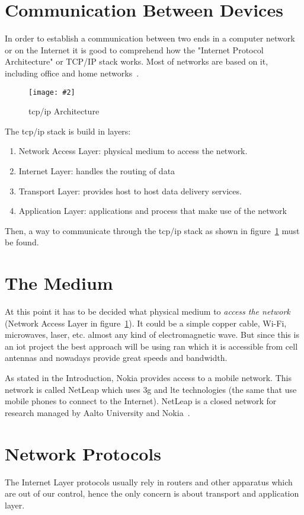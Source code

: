 \documentclass[hidelinks,11pt,a4paper,oneside,article]{memoir}
\newcommand{\putimage}[3][10] %
{
\begin{figure}[h]
	\centering
	\captionsetup{justification=centering}
	\texttt{[image: \#2]}
	\caption{#3}
	\label{fig:#2}
\end{figure}
}
\begin{document}
\section{Communication Between Devices}
In order to establish a communication between two ends in a computer network or on the Internet it is good to comprehend how the "Internet Protocol Architecture" or TCP/IP stack works. Most of networks are based on it, including office and home networks~\cite[9]{tcpip}.

	\putimage[5]{tcpip}{\gls{tcp}/\gls{ip} Architecture}

The \gls{tcp}/\gls{ip} stack is build in layers:
\begin{enumerate}
	\item Network Access Layer: physical medium to access the network.
	\item Internet Layer: handles the routing of data
	\item Transport Layer: provides host to host data delivery services.
	\item Application Layer: applications and process that make use of the network
\end{enumerate}

Then, a way to communicate through the \gls{tcp}/\gls{ip} stack as shown in figure~\ref{fig:tcpip} must be found.

\section{The Medium}\label{sec:the-medium}
At this point it has to be decided what physical medium to \textit{access the network} (Network Access Layer in figure~\ref{fig:tcpip}). It could be a simple copper cable, Wi-Fi, microwaves, laser, etc. almost any kind of electromagnetic wave. But since this is an \gls{iot} project the best approach will be using \gls{ran} which it is accessible from cell antennas and nowadays provide great speeds and bandwidth.

As stated in the Introduction, Nokia provides access to a mobile network. This network is called NetLeap which uses \gls{3g} and \gls{lte} technologies (the same that use mobile phones to connect to the Internet). NetLeap is a closed network for research managed by Aalto University and Nokia~\cite{netleap}.

\section{Network Protocols}
The Internet Layer protocols usually rely in routers and other apparatus which are out of our control, hence the only concern is about transport and application layer.
\end{document}
